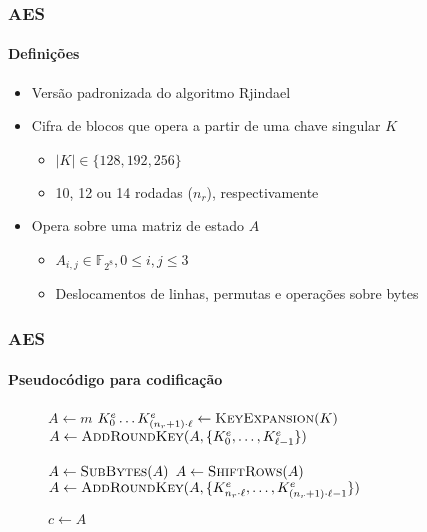 \documentclass[12pt]{beamer}
\begin{document}
\begin{frame}
    \frametitle{AES}
    \framesubtitle{Definições}
    \begin{itemize}
        \item Versão padronizada do algoritmo Rjindael \cite{Daemen:2002:DR:560131}
        \item Cifra de blocos que opera a partir de uma chave singular $K$
        \begin{itemize}
            \item $\vert K \vert \in \{128, 192, 256\}$
            \item 10, 12 ou 14 rodadas ($n_r$), respectivamente
        \end{itemize}
        \item Opera sobre uma matriz de estado $A$
        \begin{itemize}
            \item $A_{i,j} \in \mathbb{F}_{2^8}, 0 \leq i, j \leq 3$
            \item Deslocamentos de linhas, permutas e operações sobre bytes
        \end{itemize}
    \end{itemize}
\end{frame}

\begin{frame}
    \footnotesize
    \frametitle{AES}
    \framesubtitle{Pseudocódigo para codificação}
    \begin{figure}[ht]
      \centering
      \begin{minipage}{.7\linewidth}
        \begin{algorithm}[H]
        
            $A \leftarrow m$\;
            $K^{e}_{0} \dots K^{e}_{(n_r + 1) \cdot \ell}
                \leftarrow \textsc{KeyExpansion}(K)$\;
            $A \leftarrow \textsc{AddRoundKey}(A,
                \{K^{e}_{0}, \dots, K^{e}_{\ell - 1}\})$\;
            
         
            $A \leftarrow \textsc{SubBytes}(A)$\;
            $A \leftarrow \textsc{ShiftRows}(A)$\;
            $A \leftarrow \textsc{AddRoundKey}(A,
                \{K^{e}_{n_r \cdot \ell}, \dots, K^{e}_{(n_r + 1) \cdot \ell - 1}\})$\;
        
            $c \leftarrow A$\;
        \end{algorithm}
      \end{minipage}
    \end{figure}
\end{frame}
\end{document}
